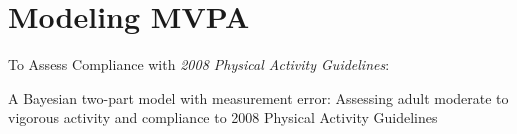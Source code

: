 \documentclass[handout]{beamer}\usepackage[]{graphicx}\usepackage[]{color}
\begin{document}
\section{Modeling MVPA}
\begin{frame}
To Assess Compliance with \emph{2008 Physical Activity Guidelines}:

\vspace{0.4cm}
\huge A Bayesian two-part model with measurement error: Assessing adult moderate to vigorous activity and compliance to 2008 Physical Activity Guidelines

\end{frame}
\end{document}
